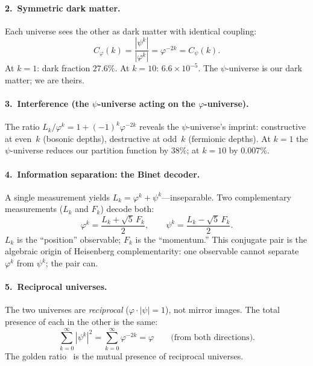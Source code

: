 \documentclass[12pt,a4paper]{article}
\begin{document}
\paragraph{2.\ Symmetric dark matter.}
Each universe sees the other as dark matter with identical coupling:
\begin{equation}
C_\varphi(k) = \frac{|\psi^k|}{|\varphi^k|} = \varphi^{-2k} = C_\psi(k).
\end{equation}
At $k = 1$: dark fraction $27.6\%$. At $k = 10$: $6.6 \times 10^{-5}$. The $\psi$-universe is our dark matter; we are theirs.

\paragraph{3.\ Interference (the $\psi$-universe acting on the $\varphi$-universe).}
The ratio $L_k/\varphi^k = 1 + (-1)^k\varphi^{-2k}$ reveals the $\psi$-universe's imprint: constructive at even~$k$ (bosonic depths), destructive at odd~$k$ (fermionic depths). At $k = 1$ the $\psi$-universe reduces our partition function by $38\%$; at $k = 10$ by $0.007\%$.

\paragraph{4.\ Information separation: the Binet decoder.}
A single measurement yields $L_k = \varphi^k + \psi^k$---inseparable. Two complementary measurements ($L_k$ and $F_k$) decode both:
\begin{equation}
\varphi^k = \frac{L_k + \sqrt{5}\,F_k}{2}, \qquad \psi^k = \frac{L_k - \sqrt{5}\,F_k}{2}.
\end{equation}
$L_k$ is the ``position'' observable; $F_k$ is the ``momentum.'' This conjugate pair is the algebraic origin of Heisenberg complementarity: one observable cannot separate $\varphi^k$ from $\psi^k$; the pair can.

\paragraph{5.\ Reciprocal universes.}
The two universes are \emph{reciprocal} ($\varphi \cdot |\psi| = 1$), not mirror images. The total presence of each in the other is the same:
\begin{equation}
\sum_{k=0}^{\infty} |\psi^k|^2 = \sum_{k=0}^{\infty} \varphi^{-2k} = \varphi \qquad \text{(from both directions)}.
\end{equation}
The golden ratio~\cite{Livio2002,Koshy2001} is the mutual presence of reciprocal universes.
\end{document}
